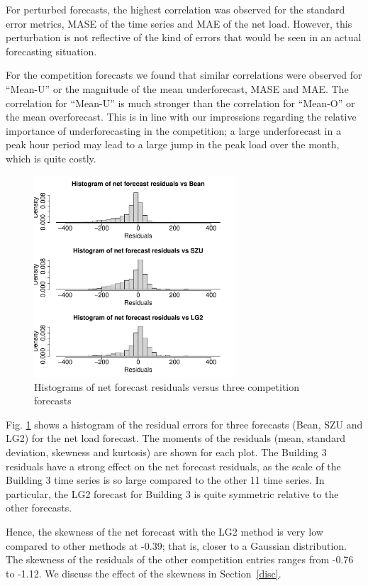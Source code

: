\documentclass[conference]{IEEEtran}
\begin{document}
For perturbed forecasts, the highest correlation was observed for the standard error metrics, MASE of the time series and MAE of the net load. However, this perturbation is not reflective of the kind of errors that would be seen in an actual forecasting situation.

For the competition forecasts we found that similar correlations were observed for ``Mean-U'' or the magnitude of the mean underforecast, MASE and MAE. The correlation for ``Mean-U'' is much stronger than the correlation for ``Mean-O'' or the mean overforecast. This is in line with our impressions regarding the relative importance of underforecasting in the competition; a large underforecast in a peak hour period may lead to a large jump in the peak load over the month, which is quite costly.

\begin{figure}
    \centering
    \includegraphics[width=7.5cm]{Figures/hist1.pdf}
    \caption{Histograms of net forecast residuals versus three competition forecasts}
    \label{fig:hist}
\end{figure}

Fig. \ref{fig:hist} shows a histogram of the residual errors for three forecasts (Bean, SZU and LG2) for the net load forecast. The moments of the residuals (mean, standard deviation, skewness and kurtosis) are shown for each plot. The Building 3 residuals have a strong effect on the net forecast residuals, as the scale of the Building 3 time series is so large compared to the other 11 time series. In particular, the LG2 forecast for Building 3 is quite symmetric relative to the other forecasts.

Hence, the skewness of the net forecast with the LG2 method is very low compared to other methods at -0.39; that is, closer to a Gaussian distribution. The skewness of the residuals of the other competition entries ranges from -0.76 to -1.12. We discuss the effect of the skewness in Section~\ref{disc}.
\end{document}
